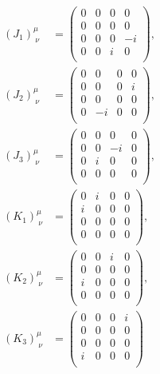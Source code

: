 \documentclass[10pt,a4paper]{jarticle}
\begin{document}
\begin{align}
(J_1)^\mu_{~\nu} &= \left(\begin{array}{cccc}
0 & 0 & 0 & 0 \\
0 & 0 & 0 & 0 \\
0 & 0 & 0 & -i \\
0 & 0 & i & 0 \\
\end{array}\right), \\
%
(J_2)^\mu_{~\nu} &= \left(\begin{array}{cccc}
0 & 0 & 0 & 0 \\
0 & 0 & 0 & i \\
0 & 0 & 0 & 0 \\
0 & -i & 0 & 0 \\
\end{array}\right), \\
%
(J_3)^\mu_{~\nu} &= \left(\begin{array}{cccc}
0 & 0 & 0 & 0 \\
0 & 0 & -i & 0 \\
0 & i & 0 & 0 \\
0 & 0 & 0 & 0 \\
\end{array}\right), \\
%
(K_1)^\mu_{~\nu} &= \left(\begin{array}{cccc}
0 & i & 0 & 0 \\
i & 0 & 0 & 0 \\
0 & 0 & 0 & 0 \\
0 & 0 & 0 & 0 \\
\end{array}\right), \\
%
(K_2)^\mu_{~\nu} &= \left(\begin{array}{cccc}
0 & 0 & i & 0 \\
0 & 0 & 0 & 0 \\
i & 0 & 0 & 0 \\
0 & 0 & 0 & 0 \\
\end{array}\right), \\
%
(K_3)^\mu_{~\nu} &= \left(\begin{array}{cccc}
0 & 0 & 0 & i \\
0 & 0 & 0 & 0 \\
0 & 0 & 0 & 0 \\
i & 0 & 0 & 0 \\
\end{array}\right)
\end{align}
\end{document}
